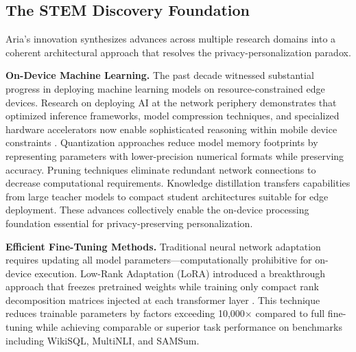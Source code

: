 \documentclass[11pt]{article}
\begin{document}
\vspace*{-8pt}
\subsection{The STEM Discovery Foundation}
\vspace*{-8pt}
Aria's innovation synthesizes advances across multiple research domains into a coherent architectural approach that resolves the privacy-personalization paradox.

\textbf{On-Device Machine Learning.} The past decade witnessed substantial progress in deploying machine learning models on resource-constrained edge devices. Research on deploying AI at the network periphery demonstrates that optimized inference frameworks, model compression techniques, and specialized hardware accelerators now enable sophisticated reasoning within mobile device constraints \cite{chen2019deep}. Quantization approaches reduce model memory footprints by representing parameters with lower-precision numerical formats while preserving accuracy. Pruning techniques eliminate redundant network connections to decrease computational requirements. Knowledge distillation transfers capabilities from large teacher models to compact student architectures suitable for edge deployment. These advances collectively enable the on-device processing foundation essential for privacy-preserving personalization.

\textbf{Efficient Fine-Tuning Methods.} Traditional neural network adaptation 
requires updating all model parameters---computationally prohibitive for 
on-device execution. Low-Rank Adaptation (LoRA) introduced a breakthrough 
approach that freezes pretrained weights while training only compact rank 
decomposition matrices injected at each transformer layer \cite{hu2022lora}. 
This technique reduces trainable parameters by factors exceeding 10,000$\times$ 
compared to full fine-tuning while achieving comparable or superior task 
performance on benchmarks including WikiSQL, MultiNLI, and SAMSum.
\end{document}
